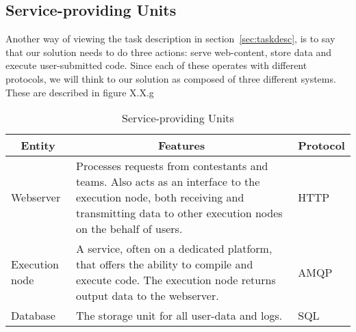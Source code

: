\subsection{Service-providing Units}

Another way of viewing the task description in section~\ref{sec:taskdesc}, is to say
that our solution needs to do three actions: serve web-content, store
data and execute user-submitted code. Since each of these operates with
different protocols, we will think to our solution as composed of three
different systems. These are described in figure X.X.g

\pagebreak
\begin{longtable}{|l|m{}|m{}|}
\caption{Service-providing Units} \label{table:serviceUnits} \\
\hline \multicolumn{1}{|c|}{\textbf{Entity}} &
\multicolumn{1}{c|}{\textbf{Features}} &
\multicolumn{1}{c|}{\textbf{Protocol}} \\
\hline
Webserver & Processes requests from contestants and teams. Also acts as an
interface to the execution node, both receiving and transmitting data
to other execution nodes on the behalf of users. & HTTP\\\hline

Execution node & A service, often on a dedicated platform, that offers the
ability to compile and execute code. The execution node returns output data to
the webserver. & AMQP\\\hline

Database & The storage unit for all user{}-data and logs. & SQL\\\hline
\end{longtable}



